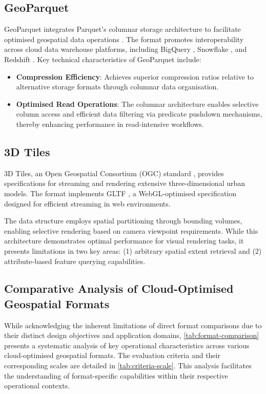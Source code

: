 \subsection{GeoParquet}
\label{rw:cloud_optimised_implementations:geoparquet}
GeoParquet integrates Parquet's columnar storage architecture to facilitate optimised geospatial data operations \citep{geoparquet}. The format promotes interoperability across cloud data warehouse platforms, including BigQuery \citep{bigquery}, Snowflake \citep{snowflake}, and Redshift \citep{redshift}. Key technical characteristics of GeoParquet include:

\begin{itemize}
  \item \textbf{Compression Efficiency}: Achieves superior compression ratios relative to alternative storage formats through columnar data organisation.
  \item \textbf{Optimised Read Operations}: The columnar architecture enables selective column access and efficient data filtering via predicate pushdown mechanisms, thereby enhancing performance in read-intensive workflows.
\end{itemize}

\subsection{3D Tiles}
\label{rw:cloud_optimised_implementations:3d_tiles}
3D Tiles, an Open Geospatial Consortium (OGC) standard \citep{3d_tiles}, provides specifications for streaming and rendering extensive three-dimensional urban models. The format implements GLTF \citep{gltf}, a WebGL-optimised specification designed for efficient streaming in web environments.

The data structure employs spatial partitioning through bounding volumes, enabling selective rendering based on camera viewpoint requirements. While this architecture demonstrates optimal performance for visual rendering tasks, it presents limitations in two key areas: (1) arbitrary spatial extent retrieval and (2) attribute-based feature querying capabilities.

\subsection{Comparative Analysis of Cloud-Optimised Geospatial Formats}
\label{rw:cloud_optimised_implementations:comparison}
While acknowledging the inherent limitations of direct format comparisons due to their distinct design objectives and application domains, \autoref{tab:format-comparison} presents a systematic analysis of key operational characteristics across various cloud-optimised geospatial formats. The evaluation criteria and their corresponding scales are detailed in \autoref{tab:criteria-scale}. This analysis facilitates the understanding of format-specific capabilities within their respective operational contexts.

